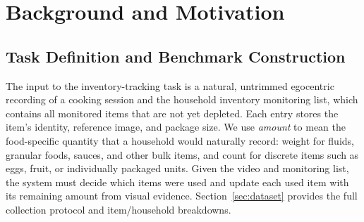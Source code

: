 \documentclass[sigconf,anonymous,nonacm]{acmart}
\begin{document}

\section{Background and Motivation}
\label{sec:motivation}

\subsection{Task Definition and Benchmark Construction}
\label{sec:bg-task}

The input to the inventory-tracking task is a natural, untrimmed
egocentric recording of a cooking session and the household 
inventory monitoring list, which contains all monitored items 
that are not yet depleted. Each entry stores the item's identity, 
reference image, and package size.
We use \emph{amount} to mean the food-specific quantity that 
a household would naturally record: weight for fluids,
granular foods, sauces, and other bulk items, and count for 
discrete items such as eggs, fruit, or individually packaged units. Given the
video and monitoring list, the system must decide which items were used
and update each used item with its remaining amount from visual evidence. Section~\ref{sec:dataset}
provides the full collection protocol and item/household breakdowns.
\end{document}
